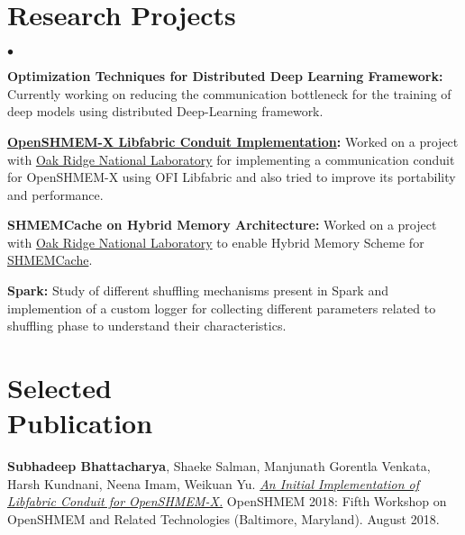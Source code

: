 \documentclass[margin,line]{res}
\newenvironment{list2}{
  \begin{list}{$\bullet$}{%
      \setlength{\itemsep}{0in}
      \setlength{\parsep}{0in} \setlength{\parskip}{0in}
      \setlength{\topsep}{0in} \setlength{\partopsep}{0in} 
      \setlength{\leftmargin}{0.2in}}}{\end{list}}
\begin{document}
\begin{resume}
\section{\sc Research Projects}
\begin{list2}
	\item {\bf 
		{Optimization Techniques for Distributed Deep Learning Framework}:} 
		Currently working on reducing the communication bottleneck for the 
		training of deep models using 
		distributed Deep-Learning framework.
	\item {\bf 
		\href{https://github.com/ornl-languages/ornl-openshmem/}{OpenSHMEM-X 
			Libfabric 
			Conduit Implementation}:} Worked on a project with 
	\href{https://www.ornl.gov/}{Oak Ridge National Laboratory} for 
	implementing a 
	communication conduit for OpenSHMEM-X using OFI Libfabric and also tried to 
	improve 
	its portability and performance.
	\item {\bf SHMEMCache on Hybrid Memory Architecture:} Worked on a project 
	with 
	\href{https://www.ornl.gov/}{Oak Ridge National Laboratory} to enable 
	Hybrid 
	Memory Scheme for 
	\href{http://ww2.cs.fsu.edu/~fu/files/shmemcache-ccgrid17-paper.pdf}{SHMEMCache}.
	\item {\bf Spark:} Study of different shuffling mechanisms present in 
	Spark 
	and 
	implemention of a custom logger for collecting different parameters related 
	to 
	shuffling phase to understand their characteristics.
\end{list2}

\vspace*{-.18in}

\section{\sc Selected \\Publication}
{\bf Subhadeep Bhattacharya}, Shaeke Salman, Manjunath Gorentla Venkata, Harsh 
Kundnani, Neena Imam, Weikuan Yu. 
{\href{https://www.csm.ornl.gov/workshops/openshmem2018/presentations/openshmem18-paper5.pdf}{\textit{An
			Initial Implementation of Libfabric Conduit for OpenSHMEM-X.}}} 
OpenSHMEM 2018: 
Fifth Workshop on OpenSHMEM and Related Technologies (Baltimore, Maryland). 
August 2018.

\vspace*{-.18in}


\end{resume}
\end{document}
